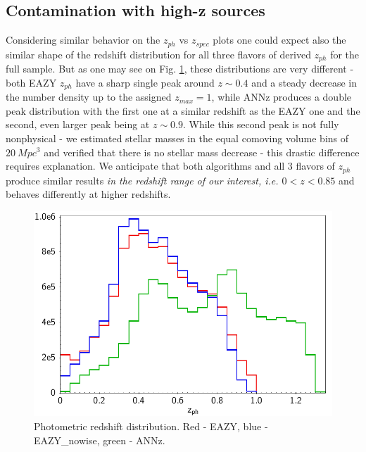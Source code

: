 \documentclass[apj,iop]{emulateapj}
\begin{document}

\subsection{Contamination with high-z sources} \label{high-z}

Considering similar behavior on the $z_{ph}$ vs $z_{spec}$ plots one could expect also the similar shape of the redshift distribution for all three flavors of derived $z_{ph}$ for the full sample. But as one may see on Fig. \ref{fig:hist_3zphot}, these distributions are very different - both EAZY $z_{ph}$ have a sharp single peak around $z\sim 0.4$ and a steady decrease in the number density up to the assigned $z_{max} = 1$, while ANNz produces a double peak distribution with the first one at a similar redshift as the EAZY one and the second, even larger peak being at $z\sim 0.9$. While this second peak is not fully nonphysical - we estimated stellar masses in the equal comoving volume bins of $20\ Mpc^3$ and verified that there is no stellar mass decrease - this drastic difference requires explanation. We anticipate that both algorithms and all 3 flavors of $z_{ph}$ produce similar results \textit{in the redshift range of our interest, i.e. $0 < z < 0.85$} and behaves differently at higher redshifts.

\begin{figure}
\begin{minipage}{\columnwidth}
\includegraphics[width=\columnwidth,height=0.28\textheight]{figures/hist_3zphot.png}
\caption{Photometric redshift distribution. Red - EAZY, blue - EAZY\_nowise, green - ANNz.}
\label{fig:hist_3zphot}
\end{minipage}
\end{figure}
\end{document}
